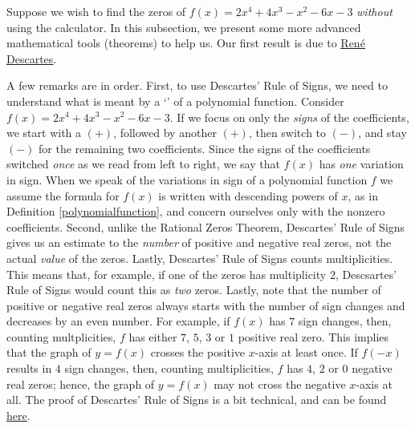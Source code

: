 Suppose we wish to find the zeros of $f(x) = 2x^4+4x^3-x^2-6x-3$ \textit{without} using the calculator.  In this subsection, we present some more advanced mathematical tools (theorems) to help us.  Our first result is due to \href{http://en.wikipedia.org/wiki/Descartes}{\underline{Ren\'{e} Descartes}}.

\smallskip


\smallskip

A few remarks are in order. First, to use Descartes' Rule of Signs, we need to understand what is meant by a `' of a polynomial function.  Consider $f(x) = 2x^4+4x^3-x^2-6x-3$.  If we focus on only the \textit{signs} of the coefficients, we start with a $(+)$, followed by another $(+)$, then switch to $(-)$, and stay $(-)$ for the remaining two coefficients.  Since the signs of the coefficients switched \textit{once} as we read from left to right, we say that $f(x)$ has \textit{one} variation in sign.  When we speak of the variations in sign of a polynomial function $f$ we assume the formula for $f(x)$ is written with descending powers of $x$, as in Definition \ref{polynomialfunction}, and concern ourselves only with the nonzero coefficients.  Second, unlike the Rational Zeros Theorem, Descartes' Rule of Signs gives us an estimate to the \textit{number} of positive and negative real zeros, not the actual \textit{value} of the zeros. Lastly, Descartes' Rule of Signs counts multiplicities.  This means that, for example, if one of the zeros has multiplicity $2$, Descsartes' Rule of Signs would count this as \textit{two} zeros.  Lastly, note that the number of positive or negative real zeros always starts with the number of sign changes and decreases by an even number.  For example, if $f(x)$ has $7$ sign changes, then, counting multplicities, $f$ has either $7$, $5$, $3$ or $1$ positive real zero.  This implies that the graph of $y=f(x)$ crosses the positive $x$-axis at least once.  If $f(-x)$ results in $4$ sign changes, then, counting multiplicities, $f$ has $4$, $2$ or $0$ negative real zeros;  hence, the graph of $y=f(x)$ may not cross the negative $x$-axis at all.  The proof of Descartes' Rule of Signs is a bit technical, and can be found \href{http://www.cut-the-knot.org/fta/ROS2.shtml}{\underline{here}}. 

